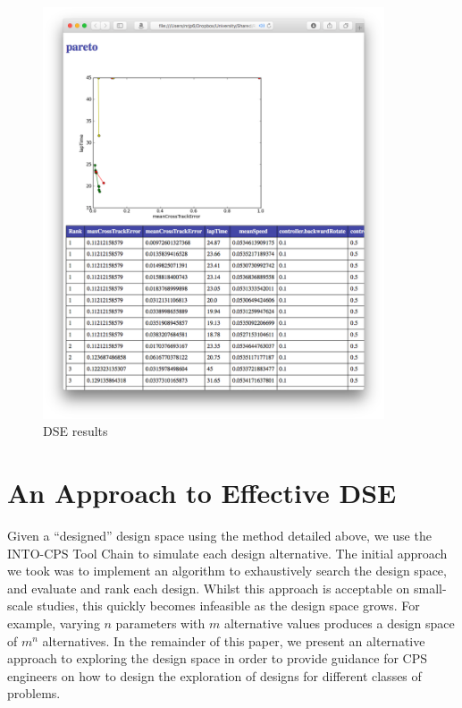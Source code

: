 \begin{figure}[h!]
	\centering
	\includegraphics[width=0.9\textwidth]{figures/dse_results}
	\caption{DSE results}
	\label{fig:dse-results}
\end{figure}

\section{An Approach to Effective DSE}
\label{sec:dse-algorithms}

Given a ``designed'' design space using the method detailed above, we use the INTO-CPS Tool Chain to simulate each design alternative. The initial approach we took was to implement an algorithm to exhaustively search the design space, and evaluate and rank each design. Whilst this approach is acceptable on small-scale studies, this quickly becomes infeasible as the design space grows. For example, varying $n$ parameters with $m$ alternative values produces a design space of $m^n$ alternatives. In the remainder of this paper, we present an alternative approach to exploring the design space in order to provide guidance for CPS engineers on how to design the exploration of designs for different classes of problems.

